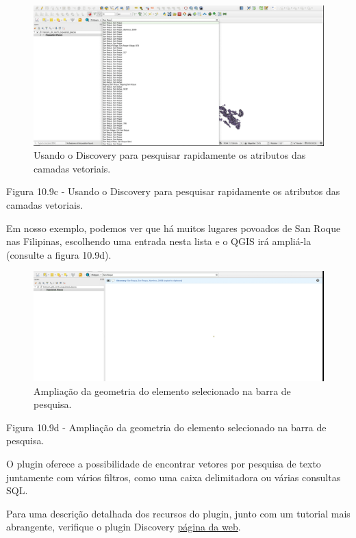 \documentclass[
]{krantz}
\begin{document}
\begin{figure}
\centering
\includegraphics{media/modulo10/fig109_c.png}
\caption{Usando o Discovery para pesquisar rapidamente os atributos das camadas vetoriais.}
\end{figure}

Figura 10.9c - Usando o Discovery para pesquisar rapidamente os atributos das camadas vetoriais.

Em nosso exemplo, podemos ver que há muitos lugares povoados de San Roque nas Filipinas, escolhendo uma entrada nesta lista e o QGIS irá ampliá-la (consulte a figura 10.9d).

\begin{figure}
\centering
\includegraphics{media/modulo10/fig109_d.png}
\caption{Ampliação da geometria do elemento selecionado na barra de pesquisa.}
\end{figure}

Figura 10.9d - Ampliação da geometria do elemento selecionado na barra de pesquisa.

O plugin oferece a possibilidade de encontrar vetores por pesquisa de texto juntamente com vários filtros, como uma caixa delimitadora ou várias consultas SQL.

Para uma descrição detalhada dos recursos do plugin, junto com um tutorial mais abrangente, verifique o plugin Discovery \href{https://www.lutraconsulting.co.uk/projects/discovery/}{página da web}.
\end{document}
